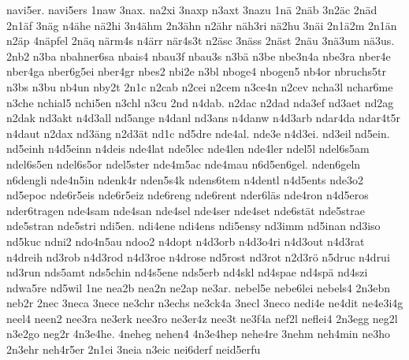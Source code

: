 {    navi5er.
    navi5ers
    1naw
    3nax.
    na2xi
    3naxp
    n3axt
    3nazu
    1nä
    2näb
    3n2äc
    2näd
    2n1äf
    3näg
    n4ähe
    nä2hi
    3n4ähm
    2n3ähn
    n2ähr
    näh3ri
    nä2hu
    3näi
    2n1ä2m
    2n1än
    n2äp
    4näpfel
    2näq
    närm4s
    n4ärr
    när4s3t
    n2äsc
    3näss
    2näst
    2näu
    3nä3um
    nä3us.
    2nb2
    n3ba
    nbahner6sa
    nbais4
    nbau3f
    nbau3s
    n3bä
    n3be
    nbe3n4a
    nbe3ra
    nber4e
    nber4ga
    nber6g5ei
    nber4gr
    nbes2
    nbi2e
    n3bl
    nboge4
    nbogen5
    nb4or
    nbruchs5tr
    n3bs
    n3bu
    nb4un
    nby2t
    2n1c
    n2cab
    n2cei
    n2cem
    n3ce4n
    n2cev
    ncha3l
    nchar6me
    n3che
    nchial5
    nchi5en
    n3chl
    n3cu
    2nd
    n4dab.
    n2dac
    n2dad
    nda3ef
    nd3aet
    nd2ag
    n2dak
    nd3akt
    n4d3all
    nd5ange
    n4danl
    nd3ans
    n4danw
    n4d3arb
    ndar4da
    ndar4t5r
    n4daut
    n2dax
    nd3äng
    n2d3ät
    nd1c
    nd5dre
    nde4al.
    nde3e
    n4d3ei.
    nd3eil
    nd5ein.
    nd5einh
    n4d5einn
    n4deis
    nde4lat
    nde5lec
    nde4len
    nde4ler
    ndel5l
    ndel6s5am
    ndel6s5en
    ndel6s5or
    ndel5ster
    nde4m5ac
    nde4mau
    n6d5en6gel.
    nden6geln
    n6dengli
    nde4n5in
    ndenk4r
    nden5s4k
    ndens6tem
    n4dentl
    n4d5ents
    nde3o2
    nd5epoc
    nde6r5eis
    nde6r5eiz
    nde6reng
    nde6rent
    nder6läs
    nde4ron
    n4d5eros
    nder6tragen
    nde4sam
    nde4san
    nde4sel
    nde4ser
    nde4set
    nde6stät
    nde5strae
    nde5stran
    nde5stri
    ndi5en.
    ndi4ene
    ndi4ens
    ndi5ensy
    nd3imm
    nd5inan
    nd3iso
    nd5kuc
    ndni2
    ndo4n5au
    ndoo2
    n4dopt
    n4d3orb
    n4d3o4ri
    n4d3out
    n4d3rat
    n4dreih
    nd3rob
    n4d3rod
    n4d3roe
    n4drose
    nd5rost
    nd3rot
    n2d3rö
    n5druc
    n4drui
    nd3run
    nds5amt
    nds5chin
    nd4s5ene
    nds5erb
    nd4skl
    nd4spae
    nd4spä
    nd4szi
    ndwa5re
    nd5wil
    1ne
    nea2b
    nea2n
    ne2ap
    ne3ar.
    nebel5e
    nebe6lei
    nebels4
    2n3ebn
    neb2r
    2nec
    3neca
    3nece
    ne3chr
    n3echs
    ne3ck4a
    3necl
    3neco
    nedi4e
    ne4dit
    ne4e3i4g
    neel4
    neen2
    nee3ra
    ne3erk
    nee3ro
    ne3er4z
    nee3t
    ne3f4a
    nef2l
    neflei4
    2n3egg
    neg2l
    n3e2go
    neg2r
    4n3e4he.
    4neheg
    nehen4
    4n3e4hep
    nehe4re
    3nehm
    neh4min
    ne3ho
    2n3ehr
    neh4r5er
    2n1ei
    3neia
    n3eic
    nei6derf
    neid5erfu
}
